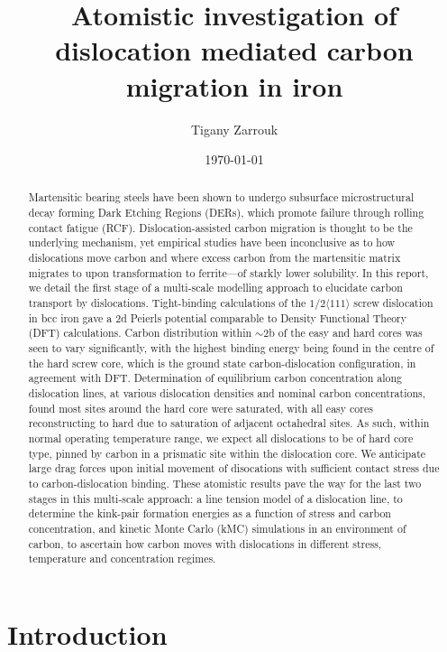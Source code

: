 \documentclass[a4paper,11pt]{article}
\author{Tigany Zarrouk}
\date{\today}
\title{Atomistic investigation of dislocation mediated carbon migration in iron}
\begin{document}
\maketitle
\tableofcontents

\clearpage

\begin{abstract}
Martensitic bearing steels have been shown to undergo subsurface microstructural decay forming
Dark Etching Regions (DERs), which promote failure through rolling contact fatigue
(RCF). Dislocation-assisted carbon migration is thought to be the underlying mechanism, yet
empirical studies have been inconclusive as to how dislocations move carbon and where excess
carbon from the martensitic matrix migrates to upon transformation to ferrite---of starkly lower
solubility. In this report, we detail the first stage of a multi-scale modelling approach to
elucidate carbon transport by dislocations. Tight-binding calculations of the $1/2\langle 111 \rangle$ screw
dislocation in bcc iron gave a 2d Peierls potential comparable to Density Functional Theory (DFT)
calculations. Carbon distribution within $\sim2$b of the easy and hard cores was seen to vary
significantly, with the highest binding energy being found in the centre of the hard screw core,
which is the ground state carbon-dislocation configuration, in agreement with DFT. Determination
of equilibrium carbon concentration along dislocation lines, at various dislocation densities and
nominal carbon concentrations, found most sites around the hard core were saturated, with all easy
cores reconstructing to hard due to saturation of adjacent octahedral sites. As such, within normal
operating temperature range, we expect all dislocations to be of hard core type, pinned by carbon
in a prismatic site within the dislocation core. We anticipate large drag forces upon initial
movement of disocations with sufficient contact stress due to carbon-dislocation binding. These
atomistic results pave the way for the last two stages in this multi-scale approach: a line
tension model of a dislocation line, to determine the kink-pair formation energies as a function
of stress and carbon concentration, and kinetic Monte Carlo (kMC) simulations in an environment of
carbon, to ascertain how carbon moves with dislocations in different stress, temperature and
concentration regimes.

\end{abstract}

\clearpage

\section{Introduction}
\label{sec:orgd2f4f5b}
\end{document}
